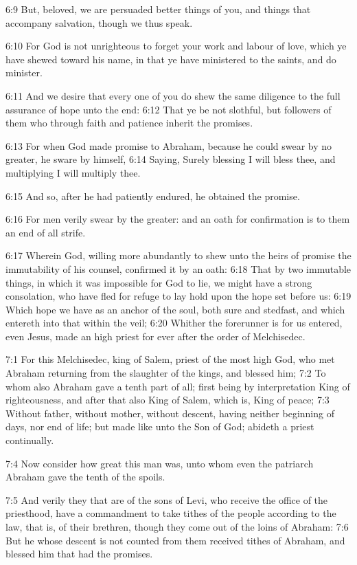 6:9 But, beloved, we are persuaded better things of you, and things
that accompany salvation, though we thus speak.

6:10 For God is not unrighteous to forget your work and labour of
love, which ye have shewed toward his name, in that ye have ministered
to the saints, and do minister.

6:11 And we desire that every one of you do shew the same diligence to
the full assurance of hope unto the end: 6:12 That ye be not slothful,
but followers of them who through faith and patience inherit the
promises.

6:13 For when God made promise to Abraham, because he could swear by
no greater, he sware by himself, 6:14 Saying, Surely blessing I will
bless thee, and multiplying I will multiply thee.

6:15 And so, after he had patiently endured, he obtained the promise.

6:16 For men verily swear by the greater: and an oath for confirmation
is to them an end of all strife.

6:17 Wherein God, willing more abundantly to shew unto the heirs of
promise the immutability of his counsel, confirmed it by an oath: 6:18
That by two immutable things, in which it was impossible for God to
lie, we might have a strong consolation, who have fled for refuge to
lay hold upon the hope set before us: 6:19 Which hope we have as an
anchor of the soul, both sure and stedfast, and which entereth into
that within the veil; 6:20 Whither the forerunner is for us entered,
even Jesus, made an high priest for ever after the order of
Melchisedec.

7:1 For this Melchisedec, king of Salem, priest of the most high God,
who met Abraham returning from the slaughter of the kings, and blessed
him; 7:2 To whom also Abraham gave a tenth part of all; first being by
interpretation King of righteousness, and after that also King of
Salem, which is, King of peace; 7:3 Without father, without mother,
without descent, having neither beginning of days, nor end of life;
but made like unto the Son of God; abideth a priest continually.

7:4 Now consider how great this man was, unto whom even the patriarch
Abraham gave the tenth of the spoils.

7:5 And verily they that are of the sons of Levi, who receive the
office of the priesthood, have a commandment to take tithes of the
people according to the law, that is, of their brethren, though they
come out of the loins of Abraham: 7:6 But he whose descent is not
counted from them received tithes of Abraham, and blessed him that had
the promises.

